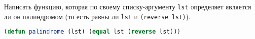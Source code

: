 Написать функцию, которая по своему списку-аргументу \verb|lst| определяет
является ли он палиндромом (то есть равны ли \verb|lst| и \verb|(reverse lst)|).

\begin{lstlisting}[language=Lisp]
(defun palindrome (lst) (equal lst (reverse lst)))
\end{lstlisting}

